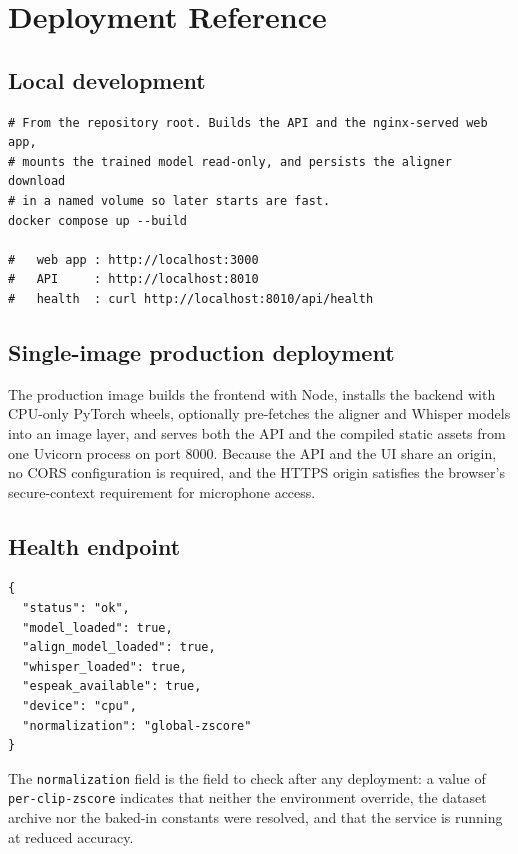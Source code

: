 \section{Deployment Reference}
\label{app:deployment}

\subsection{Local development}

\begin{lstlisting}[caption={Running the full stack locally with Docker Compose.}, label={lst:app-compose}]
# From the repository root. Builds the API and the nginx-served web app,
# mounts the trained model read-only, and persists the aligner download
# in a named volume so later starts are fast.
docker compose up --build

#   web app : http://localhost:3000
#   API     : http://localhost:8010
#   health  : curl http://localhost:8010/api/health
\end{lstlisting}

\subsection{Single-image production deployment}

The production image builds the frontend with Node, installs the backend with
CPU-only PyTorch wheels, optionally pre-fetches the aligner and Whisper models
into an image layer, and serves both the API and the compiled static assets from
one Uvicorn process on port 8000. Because the API and the UI share an origin, no
CORS configuration is required, and the HTTPS origin satisfies the browser's
secure-context requirement for microphone access.

\subsection{Health endpoint}

\begin{lstlisting}[caption={Health endpoint response for a fully ready service.}, label={lst:app-health}]
{
  "status": "ok",
  "model_loaded": true,
  "align_model_loaded": true,
  "whisper_loaded": true,
  "espeak_available": true,
  "device": "cpu",
  "normalization": "global-zscore"
}
\end{lstlisting}

\noindent
The \texttt{normalization} field is the field to check after any deployment: a
value of \texttt{per-clip-zscore} indicates that neither the environment
override, the dataset archive nor the baked-in constants were resolved, and that
the service is running at reduced accuracy.

